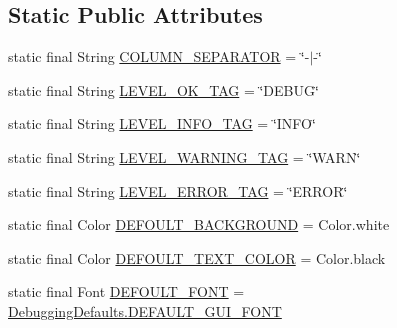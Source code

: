 \subsection*{Static Public Attributes}
\begin{DoxyCompactItemize}
\item 
static final String \hyperlink{classit_1_1emarolab_1_1cagg_1_1debugging_1_1baseComponents_1_1LoggingTable_a605ddb0b7576b16be0169a76cfd80b69}{C\-O\-L\-U\-M\-N\-\_\-\-S\-E\-P\-A\-R\-A\-T\-O\-R} = \char`\"{}-\/$\vert$-\/\char`\"{}
\item 
static final String \hyperlink{classit_1_1emarolab_1_1cagg_1_1debugging_1_1baseComponents_1_1LoggingTable_af4f9a6856ffb978d31ff5b7956fefe0e}{L\-E\-V\-E\-L\-\_\-\-O\-K\-\_\-\-T\-A\-G} = \char`\"{}D\-E\-B\-U\-G\char`\"{}
\item 
static final String \hyperlink{classit_1_1emarolab_1_1cagg_1_1debugging_1_1baseComponents_1_1LoggingTable_a5a229ce4decd7aa5931ed02a0daa821b}{L\-E\-V\-E\-L\-\_\-\-I\-N\-F\-O\-\_\-\-T\-A\-G} = \char`\"{}I\-N\-F\-O\char`\"{}
\item 
static final String \hyperlink{classit_1_1emarolab_1_1cagg_1_1debugging_1_1baseComponents_1_1LoggingTable_a4e868669f0e6c91de45aa011130a4755}{L\-E\-V\-E\-L\-\_\-\-W\-A\-R\-N\-I\-N\-G\-\_\-\-T\-A\-G} = \char`\"{}W\-A\-R\-N\char`\"{}
\item 
static final String \hyperlink{classit_1_1emarolab_1_1cagg_1_1debugging_1_1baseComponents_1_1LoggingTable_a19bb7a5bf70254f051f1b8caa5306a1f}{L\-E\-V\-E\-L\-\_\-\-E\-R\-R\-O\-R\-\_\-\-T\-A\-G} = \char`\"{}E\-R\-R\-O\-R\char`\"{}
\item 
static final Color \hyperlink{classit_1_1emarolab_1_1cagg_1_1debugging_1_1baseComponents_1_1LoggingTable_a5a4fb1b558565ce1589eb5d79f91a258}{D\-E\-F\-O\-U\-L\-T\-\_\-\-B\-A\-C\-K\-G\-R\-O\-U\-N\-D} = Color.\-white
\item 
static final Color \hyperlink{classit_1_1emarolab_1_1cagg_1_1debugging_1_1baseComponents_1_1LoggingTable_ae2b40893d267aec7c1d96d049200abf0}{D\-E\-F\-O\-U\-L\-T\-\_\-\-T\-E\-X\-T\-\_\-\-C\-O\-L\-O\-R} = Color.\-black
\item 
static final Font \hyperlink{classit_1_1emarolab_1_1cagg_1_1debugging_1_1baseComponents_1_1LoggingTable_addf06fe589b3662da818938bb2aca7fe}{D\-E\-F\-O\-U\-L\-T\-\_\-\-F\-O\-N\-T} = \hyperlink{classit_1_1emarolab_1_1cagg_1_1debugging_1_1DebuggingDefaults_a5f2a7c7991c040d770f864911e79e7ea}{Debugging\-Defaults.\-D\-E\-F\-A\-U\-L\-T\-\_\-\-G\-U\-I\-\_\-\-F\-O\-N\-T}
\item 

\end{DoxyCompactItemize}
